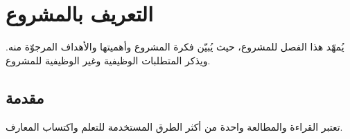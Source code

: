 

\chapter{التعريف بالمشروع}
يُمهّد هذا الفصل للمشروع، حيث يُبيّن فكرة المشروع وأهميتها والأهداف المرجوّة منه. ويذكر المتطلبات الوظيفية وغير الوظيفية للمشروع.

\section{مقدمة}
تعتبر القراءة والمطالعة واحدة من أكثر الطرق المستخدمة للتعلم واكتساب المعارف.

